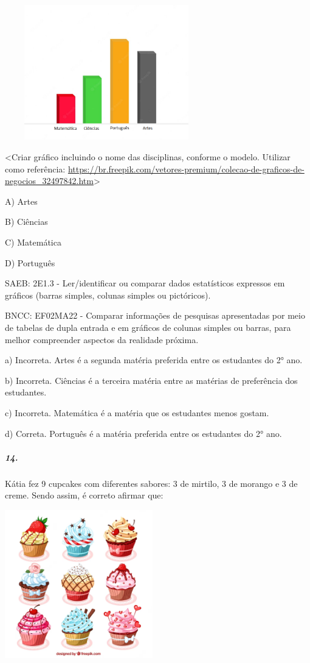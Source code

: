 \includegraphics[width=3.48228in,height=2.30682in]{media/image160.png}

\textless{}Criar gráfico incluindo o nome das disciplinas, conforme o
modelo. Utilizar como referência:
\url{https://br.freepik.com/vetores-premium/colecao-de-graficos-de-negocios_32497842.htm}\textgreater{}

A) Artes

B) Ciências

C) Matemática

D) Português

SAEB: 2E1.3 - Ler/identificar ou comparar dados estatísticos expressos
em gráficos (barras simples, colunas simples ou pictóricos).

BNCC: EF02MA22 - Comparar informações de pesquisas apresentadas por meio
de tabelas de dupla entrada e em gráficos de colunas simples ou barras,
para melhor compreender aspectos da realidade próxima.

a) Incorreta. Artes é a segunda matéria preferida entre os estudantes do
2° ano.

b) Incorreta. Ciências é a terceira matéria entre as matérias de
preferência dos estudantes.

c) Incorreta. Matemática é a matéria que os estudantes menos gostam.

d) Correta. Português é a matéria preferida entre os estudantes do 2°
ano.

\subparagraph{14. }\label{section-143}

Kátia fez 9 cupcakes com diferentes sabores: 3 de mirtilo, 3 de morango
e 3 de creme. Sendo assim, é correto afirmar que:

\includegraphics[width=2.53125in,height=2.53125in]{media/image161.png}

